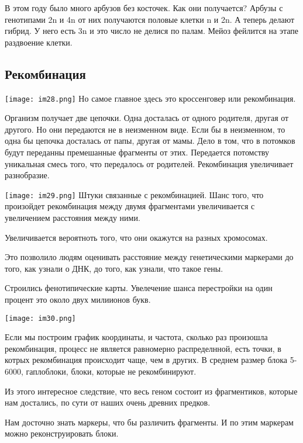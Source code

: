 В этом году было много арбузов без косточек.
Как они получается? Арбузы с генотипами 2n и 4n от
них получаются половые клетки n и 2n. А теперь
делают гибрид. У него есть 3n и это число не делися по палам.
Мейоз фейлится на этапе раздвоение клетки.   


\subsection{Рекомбинация}
\texttt{[image: im28.png]}
Но самое главное здесь это кроссенговер или рекомбинация. 

Организм получает две цепочки. Одна досталась от одного родителя,
другая от другого. Но они передаются не в неизменном виде. Если бы 
в неизменном, то одна бы цепочка досталась от папы, другая от мамы. 
Дело в том, что в потомков будут переданны премешанные фрагменты от 
этих. Передается потомству уникальная смесь того, что передалось от родителей. 
Рекомбинация увеличивает разнобразие. 

\texttt{[image: im29.png]}
Штуки связанные с рекомбинацией. Шанс того, что произойдет 
рекомбинация между двумя фрагментами увеличивается с увеличением расстояния между ними. 

Увеличивается вероятноть того, что они окажутся на разных хромосомах. 

Это позволило людям оценивать расстояние между генетическими маркерами до того, 
как узнали о ДНК, до того, как узнали, что такое гены.

Строились фенотипические карты. Увелечение шанса перестройки на один процент это около двух милиионов букв. 

\texttt{[image: im30.png]}

Если мы построим график координаты, и частота, сколько раз произошла рекомбинация, 
процесс не является равномерно распределнной, есть точки, в котрых рекомбинация происходит 
чаще, чем в других. В среднем размер блока 5-6000, гаплоблоки, блоки, которые не рекомбинируют. 

Из этого интересное следствие, что весь геном состоит из фрагментиков, 
которые нам достались, по сути от наших очень древних предков. 

Нам досточно знать маркеры, что бы различить фрагменты. И по этим маркерам 
можно реконструировать блоки. 

